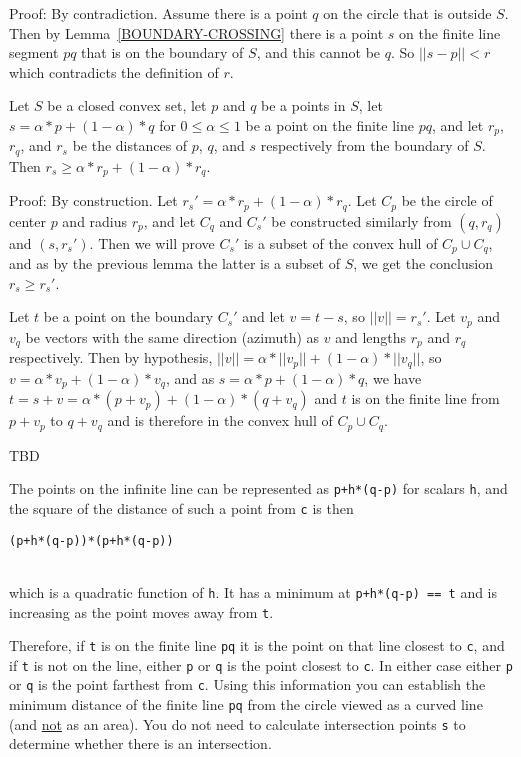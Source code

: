 \documentclass[12pt]{article}
\begin{document}
\begin{indpar}{0.2in}
Proof:  By contradiction.  Assume there is a point $q$ on the circle
that is outside $S$.  Then by Lemma~\ref{BOUNDARY-CROSSING} there is
a point $s$ on the finite line segment $pq$ that is on the boundary of
$S$, and this cannot be $q$.  So $||s-p||<r$ which contradicts the
definition of $r$.
\end{indpar}

\begin{lemma}
Let $S$ be a closed convex set, let $p$ and $q$ be a points in $S$,
let $s=\alpha*p+(1-\alpha)*q$ for $0\le\alpha\le 1$ be a point on the
finite line $pq$, and let $r_p$, $r_q$, and $r_s$ be the distances
of $p$, $q$, and $s$ respectively from the boundary of $S$.
Then $r_s\ge\alpha*r_p+(1-\alpha)*r_q$.
\end{lemma}

\begin{indpar}{0.2in}
Proof:  By construction.  Let $r_s'=\alpha*r_p+(1-\alpha)*r_q$.
Let $C_p$ be the circle of center $p$ and
radius $r_p$, and let $C_q$ and $C_s'$ be constructed similarly from
$(q,r_q)$ and $(s,r_s')$.  Then we will prove $C_s'$ is a subset of
the convex hull of $C_p\cup C_q$, and as by the previous lemma
the latter is a subset of $S$, we get the conclusion $r_s\ge r_s'$.

Let $t$ be a point on the boundary $C_s'$ and let $v=t-s$, so
$||v||=r_s'$.  Let $v_p$ and $v_q$ be vectors
with the same direction (azimuth) as $v$ and lengths $r_p$ and $r_q$
respectively.  Then by hypothesis,
$||v|| = \alpha*||v_p||+(1-\alpha)*||v_q||$, so
$v = \alpha*v_p+(1-\alpha)*v_q$, and as
$s = \alpha*p+(1-\alpha)*q$, we have
$t=s+v=\alpha*(p+v_p)+(1-\alpha)*(q+v_q)$ and 
$t$ is on the finite line from $p+v_p$ to $q+v_q$ and is therefore in the
convex hull of $C_p\cup C_q$.
\end{indpar}



TBD


The points on the infinite line can be represented as
{\tt p+h*(q-p)} for scalars {\tt h}, and the square of the distance of such a
point from {\tt c} is then \\
\centerline{\tt (p+h*(q-p))*(p+h*(q-p))} \\
which is a quadratic
function of {\tt h}.  It has a minimum at {\tt p+h*(q-p) == t} and
is increasing as the point moves away from {\tt t}.

Therefore, if {\tt t} is on the finite line {\tt pq} it is the point on
that line closest to {\tt c}, and if {\tt t} is not on the line, either
{\tt p} or {\tt q} is the point closest to {\tt c}.  In either case
either {\tt p} or {\tt q} is the point farthest from {\tt c}.  Using
this information you can establish the minimum distance of the finite
line {\tt pq} from the circle viewed as a curved line (and \underline{not}
as an area).  You do not need to calculate intersection points {\tt s}
to determine whether there is an intersection.
\end{document}
